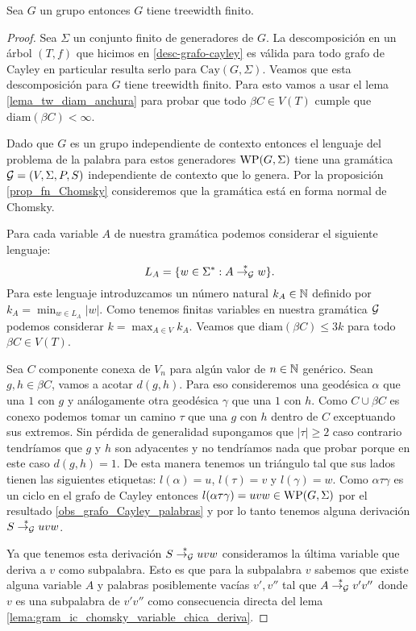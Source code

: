 \documentclass[tesis.tex]{subfiles}
\begin{document}
\begin{teo} \label{teo_ic_implica_tw}\cite{muller1985theory}
	Sea $G$ un grupo \ic entonces $G$ tiene treewidth finito.
\end{teo}
\begin{proof}
	Sea $\Sigma$ un conjunto finito de generadores de $G$.
	La descomposición en un árbol $(T,f)$ que hicimos en \ref{desc-grafo-cayley} es válida para todo grafo de Cayley en particular resulta serlo para $\text{Cay}(G,\Sigma)$.
	Veamos que esta descomposición para $G$ tiene treewidth finito. 
	Para esto vamos a usar el lema \ref{lema_tw_diam_anchura} para probar que todo $\beta C \in V(T)$ cumple que $\text{diam}(\beta C) < \infty$.
	
	
	Dado que $G$ es un grupo independiente de contexto entonces el lenguaje del problema de la palabra para estos generadores $\text{WP}(G, \Sigma)$ tiene una gramática $ {\cal G} = (V, \Sigma, P, S)$ independiente de contexto que lo genera. 
	Por la proposición \ref{prop_fn_Chomsky} consideremos que la gramática está en forma normal de Chomsky.
	
	Para cada variable $A$ de nuestra gramática podemos considerar el siguiente lenguaje:
	\[
	L_A = \{ w \in \Sigma^* : A \overset{*}{\to_{\cal G}} w  \}.
	\]
	Para este lenguaje introduzcamos un número natural $k_A \in \mathbb{N}$ definido por $k_A = {\min}_{w \in L_A} |w|$. 
	Como tenemos finitas variables en nuestra gramática $\cal G$ podemos considerar $k = \max_{A \in V} k_A$. 
	Veamos que $\text{diam}(\beta C) \le 3k$ para todo $\beta C \in V(T)$.
	
	Sea $C$ componente conexa de $V_{n}$ para algún valor de $n \in \mathbb{N}$ genérico.
	Sean $g,h \in \beta C$, vamos a acotar $d(g,h)$. 
	Para eso consideremos una geodésica $\alpha$ que una $1$ con $g$ y análogamente otra geodésica $\gamma$ que una $1$ con $h$. 
	Como $C \cup \beta C$ es conexo podemos tomar un camino $\tau$ que una $g$ con $h$ dentro de $C$ exceptuando sus extremos. 
	Sin pérdida de generalidad supongamos que $|\tau| \ge 2$ caso contrario tendríamos que $g$ y $h$ son adyacentes y no tendríamos nada que probar porque en este caso $d(g,h) =1$.
	De esta manera tenemos un triángulo tal que sus lados tienen las siguientes etiquetas:
	$l(\alpha) = u $, $l(\tau) =v$ y $l(\gamma) = w$.
	Como $\alpha \tau \gamma$ es un ciclo en el grafo de Cayley entonces $l(\alpha \tau \gamma) = uvw \in  \text{WP}(G, \Sigma)$ por el resultado \ref{obs_grafo_Cayley_palabras} y por lo tanto tenemos alguna derivación $S \overset{*}{\to_{\cal G}} uvw$.
	
	Ya que tenemos esta derivación $S \overset{*}{\to_{\cal G}} uvw$ consideramos la última variable que deriva a $v$ como subpalabra. 
	Esto es que para la subpalabra $v$ sabemos que existe alguna variable $A$ y palabras posiblemente vacías $v',v''$ tal que $A \overset{*}{\to_{\cal G}} v'v''$ donde $v$ es una subpalabra de $v'v''$ como consecuencia directa del lema \ref{lema:gram_ic_chomsky_variable_chica_deriva}.
	

\end{proof}
\end{document}
